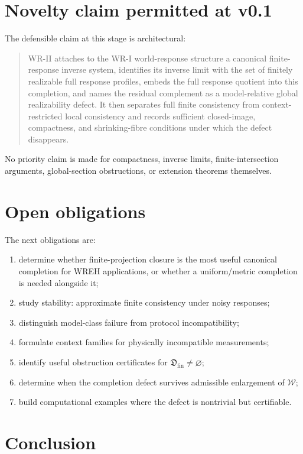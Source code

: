 \documentclass[11pt]{article}
\newcommand{\W}{\mathcal W}
\newcommand{\Dfin}{\mathfrak D_{\mathrm{fin}}}
\begin{document}
\section{Novelty claim permitted at v0.1}

The defensible claim at this stage is architectural:

\begin{quote}
WR-II attaches to the WR-I world-response structure a canonical finite-response
inverse system, identifies its inverse limit with the set of finitely realizable
full response profiles, embeds the full response quotient into this completion,
and names the residual complement as a model-relative global realizability
defect. It then separates full finite consistency from context-restricted local
consistency and records sufficient closed-image, compactness, and shrinking-fibre
conditions under which the defect disappears.
\end{quote}

No priority claim is made for compactness, inverse limits, finite-intersection
arguments, global-section obstructions, or extension theorems themselves.

\section{Open obligations}

The next obligations are:
\begin{enumerate}
\item determine whether finite-projection closure is the most useful canonical
completion for WREH applications, or whether a uniform/metric completion is
needed alongside it;
\item study stability: approximate finite consistency under noisy responses;
\item distinguish model-class failure from protocol incompatibility;
\item formulate context families for physically incompatible measurements;
\item identify useful obstruction certificates for $\Dfin\neq\varnothing$;
\item determine when the completion defect survives admissible enlargement of
$\W$;
\item build computational examples where the defect is nontrivial but
certifiable.
\end{enumerate}

\section*{Conclusion}
\end{document}
